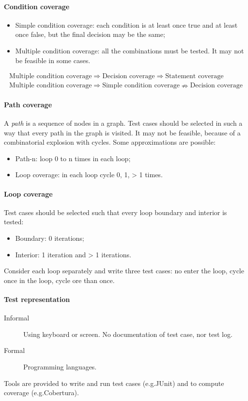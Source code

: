 \paragraph{Condition coverage}
\begin{itemize}
\item Simple condition coverage: each condition is at least once true and at least once false, but the final decision may be the same;
\item Multiple condition coverage: all the combinations must be tested. It may not be feasible in some cases.
\end{itemize}

\begin{gather*}
\text{Multiple condition coverage} \Rightarrow \text{Decision coverage} \Rightarrow \text{Statement coverage} \\
\text{Multiple condition coverage} \Rightarrow \text{Simple condition coverage} \nRightarrow \text{Decision coverage}
\end{gather*}

\paragraph{Path coverage}
A \emph{path} is a sequence of nodes in a graph. Test cases should be selected in such a way that every path in the graph is visited. It may not be feasible, because of a combinatorial explosion with cycles. Some approximations are possible:
\begin{itemize}
\item Path-n: loop 0 to n times in each loop;
\item Loop coverage: in each loop cycle 0, 1, > 1 times.
\end{itemize}

\paragraph{Loop coverage}
Test cases should be selected such that every loop boundary and interior is tested:
\begin{itemize}
\item Boundary: 0 iterations;
\item Interior: 1 iteration and > 1 iterations.
\end{itemize}
Consider each loop separately and write three test cases: no enter the loop, cycle once in the loop, cycle ore than once.

\paragraph{Test representation}
\begin{description}
\item [Informal] Using keyboard or screen. No documentation of test case, nor test log.
\item [Formal] Programming languages.
\end{description}
Tools are provided to write and run test cases (e.g.\@ JUnit) and to compute coverage (e.g.\@ Cobertura).

